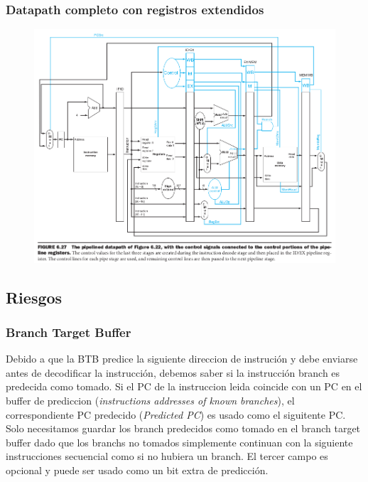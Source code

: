 \documentclass{article}
\begin{document}
\newpage
\subsubsection{Datapath completo con registros extendidos }

\begin{figure}[h!]
    \includegraphics[width=\linewidth]{imagenes/pipeline/pipeline-control-transport.png}
\end{figure}

\newpage
\subsection{Riesgos}
\subsubsection{Branch Target Buffer}

Debido a que la BTB predice la siguiente direccion de instrución y debe enviarse antes de decodificar la instrucción, debemos saber si la instrucción branch es predecida como tomado.
Si el PC de la instruccion leida coincide con un PC en el buffer de prediccion (\textit{instructions addresses of known branches}), el correspondiente PC predecido (\textit{Predicted PC}) es usado como el siguitente PC.
Solo necesitamos guardar los branch predecidos como tomado en el branch target buffer dado que los branchs no tomados simplemente continuan con la siguiente instrucciones secuencial como si no hubiera un branch.
El tercer campo es opcional y puede ser usado como un bit extra de predicción.
\end{document}

